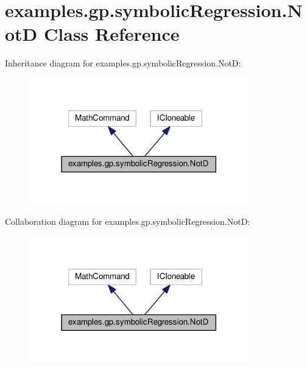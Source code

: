 \hypertarget{classexamples_1_1gp_1_1symbolic_regression_1_1_not_d}{\section{examples.\-gp.\-symbolic\-Regression.\-Not\-D Class Reference}
\label{classexamples_1_1gp_1_1symbolic_regression_1_1_not_d}
}


Inheritance diagram for examples.\-gp.\-symbolic\-Regression.\-Not\-D\-:
\nopagebreak
\begin{figure}[H]
\begin{center}
\leavevmode
\includegraphics[width=270pt]{classexamples_1_1gp_1_1symbolic_regression_1_1_not_d__inherit__graph}
\end{center}
\end{figure}


Collaboration diagram for examples.\-gp.\-symbolic\-Regression.\-Not\-D\-:
\nopagebreak
\begin{figure}[H]
\begin{center}
\leavevmode
\includegraphics[width=270pt]{classexamples_1_1gp_1_1symbolic_regression_1_1_not_d__coll__graph}
\end{center}
\end{figure}
